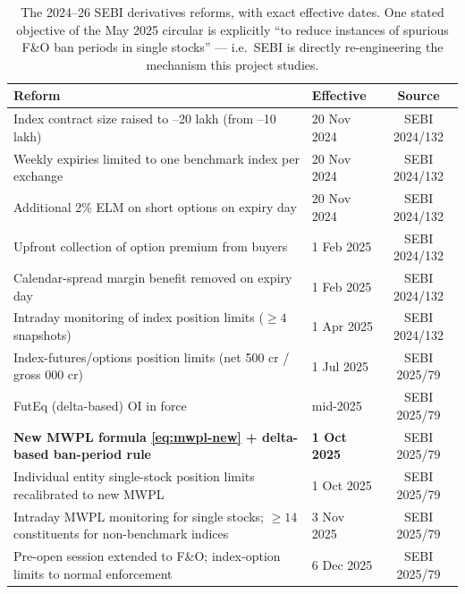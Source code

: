 \begin{table}[h]
\centering\small
\renewcommand{\arraystretch}{1.25}
\begin{tabular}{@{}p{} p{} c@{}}
\toprule
\textbf{Reform} & \textbf{Effective} & \textbf{Source} \\
\midrule
Index contract size raised to \rupee15--20 lakh (from \rupee5--10 lakh) & 20 Nov 2024 & SEBI 2024/132 \\
Weekly expiries limited to one benchmark index per exchange & 20 Nov 2024 & SEBI 2024/132 \\
Additional 2\% ELM on short options on expiry day & 20 Nov 2024 & SEBI 2024/132 \\
Upfront collection of option premium from buyers & 1 Feb 2025 & SEBI 2024/132 \\
Calendar-spread margin benefit removed on expiry day & 1 Feb 2025 & SEBI 2024/132 \\
Intraday monitoring of index position limits ($\ge 4$ snapshots) & 1 Apr 2025 & SEBI 2024/132 \\
Index-futures/options position limits (net \rupee1{,}500 cr / gross \rupee10{,}000 cr) & 1 Jul 2025 & SEBI 2025/79 \\
FutEq (delta-based) OI in force & mid-2025 & SEBI 2025/79 \\
\textbf{New MWPL formula \eqref{eq:mwpl-new} + delta-based ban-period rule} & \textbf{1 Oct 2025} & SEBI 2025/79 \\
Individual entity single-stock position limits recalibrated to new MWPL & 1 Oct 2025 & SEBI 2025/79 \\
Intraday MWPL monitoring for single stocks; $\ge 14$ constituents for non-benchmark indices & 3 Nov 2025 & SEBI 2025/79 \\
Pre-open session extended to F\&O; index-option limits to normal enforcement & 6 Dec 2025 & SEBI 2025/79 \\
\bottomrule
\end{tabular}
\caption{The 2024--26 SEBI derivatives reforms, with exact effective dates. One stated objective of the May 2025 circular is explicitly ``to reduce instances of spurious F\&O ban periods in single stocks'' --- i.e.\ SEBI is directly re-engineering the mechanism this project studies.}
\label{tab:reforms}
\end{table}

